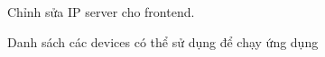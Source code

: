 \begin{figure}[H]
\centering
{}
\caption{Chỉnh sửa IP server cho frontend.}
\label{fig:update-frontend}
\end{figure}

\begin{figure}[H]
\centering
{}
\caption{Danh sách các devices có thể sử dụng để chạy ứng dụng}
\label{fig:flutter-devices}
\end{figure}


